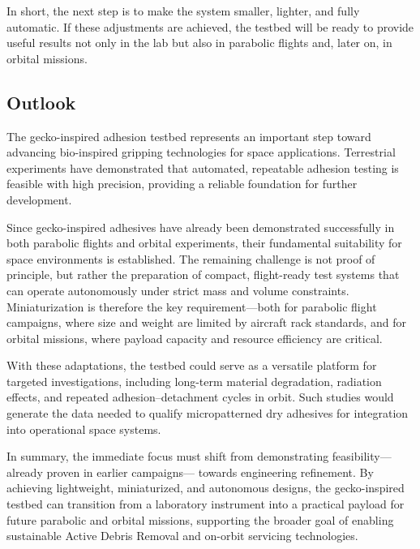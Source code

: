 \documentclass[
    twocolumn,
    fontsize = 10pt,
    parskip = half+,
    headings = small,
    headwidth = text,
    footwidth = text,
]{scrartcl}
\begin{document}
In short, the next step is to make the system smaller, lighter, and fully automatic. 
If these adjustments are achieved, the testbed will be ready to provide useful results 
not only in the lab but also in parabolic flights and, later on, in orbital missions.


\subsection{Outlook}

The gecko-inspired adhesion testbed represents an important step toward advancing bio-inspired gripping 
technologies for space applications. 
Terrestrial experiments have demonstrated that automated, repeatable adhesion testing is feasible with high precision, 
providing a reliable foundation for further development.  

Since gecko-inspired adhesives have already been demonstrated successfully in both parabolic flights 
and orbital experiments, their fundamental suitability for space environments is established. 
The remaining challenge is not proof of principle, but rather the preparation of compact, 
flight-ready test systems that can operate autonomously under strict mass and volume constraints. 
Miniaturization is therefore the key requirement—both for parabolic flight campaigns, 
where size and weight are limited by aircraft rack standards, 
and for orbital missions, where payload capacity and resource efficiency are critical.  

With these adaptations, the testbed could serve as a versatile platform for targeted investigations, 
including long-term material degradation, radiation effects, and repeated adhesion–detachment cycles in orbit. 
Such studies would generate the data needed to qualify micropatterned dry adhesives 
for integration into operational space systems.  

In summary, the immediate focus must shift from demonstrating feasibility—already proven in earlier campaigns— 
towards engineering refinement. 
By achieving lightweight, miniaturized, and autonomous designs, 
the gecko-inspired testbed can transition from a laboratory instrument 
into a practical payload for future parabolic and orbital missions, 
supporting the broader goal of enabling sustainable Active Debris Removal and on-orbit servicing technologies.
\printbibliography

\printglossaries
\appendix
{}

\end{document}
